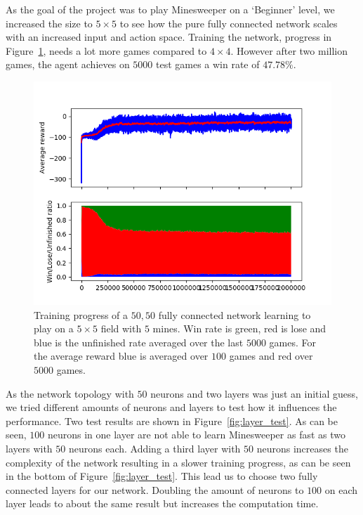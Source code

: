As the goal of the project was to play Minesweeper on a `Beginner' level, we increased the size to $5 \times 5$ to see how the pure fully connected network scales with an increased input and action space.
Training the network, progress in Figure~\ref{fig:5_5_5_fully_2million}, needs a lot more games compared to $4 \times 4$.
However after two million games, the agent achieves on $5000$ test games a win rate of $47.78\%$.

\begin{figure}
	\centering
	\includegraphics[width=\textwidth]{images/5_5_5_fully_2million.png}
	\caption{Training progress of a $50,50$ fully connected network learning to play on a $5 \times 5$ field with $5$ mines. Win rate is green, red is lose and blue is the unfinished rate averaged over the last $5000$ games. For the average reward blue is averaged over $100$ games and red over $5000$ games.}
	\label{fig:5_5_5_fully_2million}
\end{figure}

As the network topology with $50$ neurons and two layers was just an initial guess, we tried different amounts of neurons and layers to test how it influences the performance.
Two test results are shown in Figure~\ref{fig:layer_test}.
As can be seen, $100$ neurons in one layer are not able to learn Minesweeper as fast as two layers with $50$ neurons each.
Adding a third layer with $50$ neurons increases the complexity of the network resulting in a slower training progress, as can be seen in the bottom of Figure~\ref{fig:layer_test}.
This lead us to choose two fully connected layers for our network.
Doubling the amount of neurons to $100$ on each layer leads to about the same result but increases the computation time.


